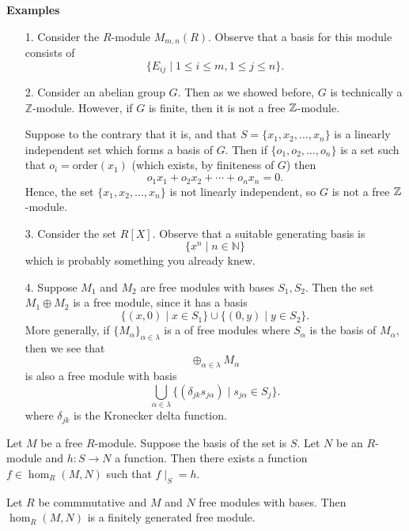 \textbf{Examples}
\begin{itemize}
    \item[1.] Consider the $R$-module $M_{m,n}(R).$ Observe that
    a basis for this module consists of 
    \[
        \{E_{ij} \mid 1 \le i \le m, 1 \le j \le n\}.
    \]

    \item[2.] Consider an abelian group $G$. Then as we showed
    before, $G$ is technically a $\mathbb{Z}$-module. However, if
    $G$ is finite, then it is not a free $\mathbb{Z}$-module. 
    
    
    Suppose to the contrary that it is, and that $S
    = \{x_1, x_2, \dots, x_n\}$ is a linearly independent set
    which forms a basis of $G$. Then if $\{o_1, o_2,
    \dots, o_n\}$ is a set such that $o_i = \text{order}(x_1)$
    (which exists, by finiteness of $G$) then  
    \[
        o_1x_1 + o_2x_2 + \cdots + o_nx_n = 0.
    \]
    Hence, the set $\{x_1, x_2, \dots, x_n\}$ is not linearly
    independent, so $G$ is not a free $\mathbb{Z}$-module.

    \item[3.] Consider the set $R[X]$. Observe that a suitable
    generating basis is 
    \[
        \{x^n \mid n \in \mathbb{N}\}
    \]
    which is probably something you already knew. 

    \item[4.] Suppose $M_1$ and $M_2$ are free modules with bases
    $S_1, S_2$. Then the set $M_1 \oplus M_2$ is a free module,
    since it has a basis 
    \[
        \{(x, 0) \mid x \in S_1\} \cup \{(0, y) \mid y \in S_2\}.
    \]
    More generally, if $\{M_\alpha\}_{\alpha \in \lambda}$ is a
    of free modules where $S_\alpha$ is the basis of $M_\alpha$,
    then we see that 
    \[
        \oplus_{\alpha \in \lambda}M_\alpha
    \]
    is also a free module with basis 
    \[
        \bigcup_{\alpha \in \lambda}\{(\delta_{jk}s_{j\alpha}) \mid s_{j\alpha} \in S_j\}.
    \]
    where $\delta_{jk}$ is the Kronecker delta function.
\end{itemize}

\begin{proposition}\label{prop: unique homomorphism}
    Let $M$ be a free $R$-module. Suppose the basis of the set is
    $S$. Let $N$ be an $R$-module and $h: S \to N$ a function.
    Then there exists a function $f \in \hom_R(M, N)$ such that
    $f\mid_S = h$. 
\end{proposition}

\begin{thm}
    Let $R$ be commmutative and $M$ and $N$ free modules with
    bases. Then $\hom_R(M, N)$ is a finitely generated free
    module. 
\end{thm}

